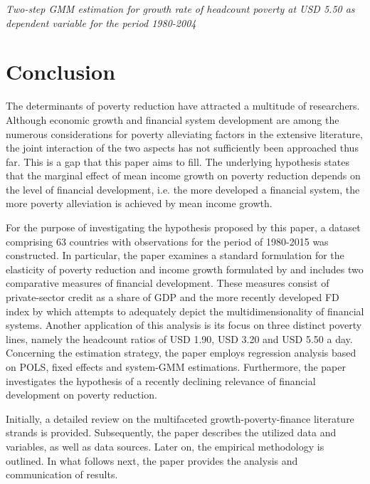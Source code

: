 \documentclass[12pt, a4paper]{article}
\begin{document}
\begin{table}
\begin{threeparttable}
\begin{tablenotes}
		\end{tablenotes}
	\end{threeparttable}
	\caption[Two-Step System-GMM Estimation Results for Headcount Poverty at USD 5.50 for 1980-2004]{\textit{Two-step GMM estimation for growth rate of headcount poverty at USD 5.50 as dependent variable for the period 1980-2004}}
	\label{2GMM5502005}
\end{table}

\newpage

\section{Conclusion} \label{conclusion}

The determinants of poverty reduction have attracted a multitude of researchers. Although economic growth and financial system development are among the numerous considerations for poverty alleviating factors in the extensive literature, the joint interaction of the two aspects has not sufficiently been approached thus far. This is a gap that this paper aims to fill. The underlying hypothesis states that the marginal effect of mean income growth on poverty reduction depends on the level of financial development, i.e. the more developed a financial system, the more poverty alleviation is achieved by mean income growth.

For the purpose of investigating the hypothesis proposed by this paper, a dataset comprising 63 countries with observations for the period of 1980-2015 was constructed. In particular, the paper examines a standard formulation for the elasticity of poverty reduction and income growth formulated by  and includes two comparative measures of financial development. These measures consist of private-sector credit as a share of GDP and the more recently developed FD index by  which attempts to adequately depict the multidimensionality of financial systems. Another application of this analysis is its focus on three distinct poverty lines, namely the headcount ratios of USD 1.90, USD 3.20 and USD 5.50 a day. Concerning the estimation strategy, the paper employs regression analysis based on POLS, fixed effects and system-GMM estimations. Furthermore, the paper investigates the hypothesis of a recently declining relevance of financial development on poverty reduction.

Initially, a detailed review on the multifaceted growth-poverty-finance literature strands is provided. Subsequently, the paper describes the utilized data and variables, as well as data sources. Later on, the empirical methodology is outlined. In what follows next, the paper provides the analysis and communication of results.
\end{document}

